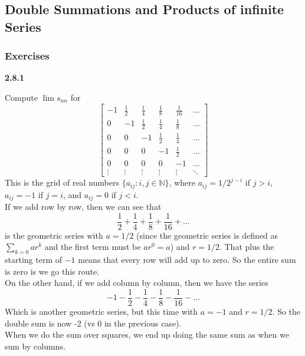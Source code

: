 \subsection{Double Summations and Products of infinite Series}

\subsubsection{Exercises}

\textbf{2.8.1}

Compute $\lim s_{nn}$ for
$$
\begin{bmatrix}
-1     & \frac{1}{2} & \frac{1}{4} & \frac{1}{8} & \frac{1}{16} & \ldots \\[6pt]
0      & -1          & \frac{1}{2} & \frac{1}{4} & \frac{1}{8}  & \ldots \\[6pt]
0      & 0           & -1          & \frac{1}{2} & \frac{1}{4}  & \ldots \\[6pt]
0      & 0           & 0           & -1          & \frac{1}{2}  & \ldots \\[6pt]
0      & 0           & 0           & 0           & -1           & \ldots \\[6pt]
\vdots & \vdots      & \vdots      & \vdots      & \vdots       & \ddots
\end{bmatrix}
$$
This is the grid of real numbers $\{ a_{ij} : i,j \in \mathbb{N} \}$,
where $a_{ij} = 1/2^{j-i}$ if $j>i$, $a_{ij} = -1$ if $j=i$, and $a_{ij} = 0$ if $j<i$.
\\

If we add row by row, then we can see that
$$
\frac{1}{2} + \frac{1}{4} + \frac{1}{8} + \frac{1}{16} + \ldots
$$
is the geometric series with $a=1/2$ (since the geometric series is defined as $\sum_{k=0} ar^k$
and the first term must be $ar^0 = a$) and $r=1/2$.
That plus the starting term of $-1$ means that every row will add up to zero.
So the entire sum is zero is we go this route.
\\

On the other hand, if we add column by column, then we have the series
$$
-1 - \frac{1}{2} - \frac{1}{4} - \frac{1}{8} - \frac{1}{16} - \ldots
$$
Which is another geometric series, but this time with $a=-1$ and $r=1/2$.
So the double sum is now -2 (vs 0 in the previous case).
\\

When we do the sum over squares, we end up doing the same sum as when we sum by columns.
\\~\\



